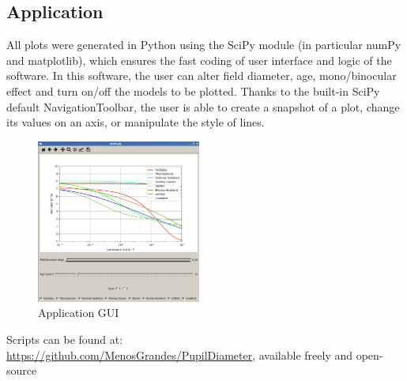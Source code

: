 \documentclass[USenglish,twocolumn]{article}
\begin{document}
\subsection{Application}
All plots were generated in Python using the SciPy module (in particular numPy and matplotlib), which ensures the fast coding of user interface and logic of the software.
In this software, the user can alter field diameter, age, mono/binocular effect and turn on/off the models to be plotted. Thanks to the built-in SciPy default NavigationToolbar, the user is able to create a snapshot of a plot, change its values on an axis, or manipulate the style of lines.
\begin{figure}[H]
	\centering
	\includegraphics[width=0.48\textwidth]{img/app.png}
	\caption{Application GUI}	
	\label{fig:app}
\end{figure}
\noindent Scripts can be found at:\\ \url{https://github.com/MenosGrandes/PupilDiameter}, available freely and open-source
\end{document}

